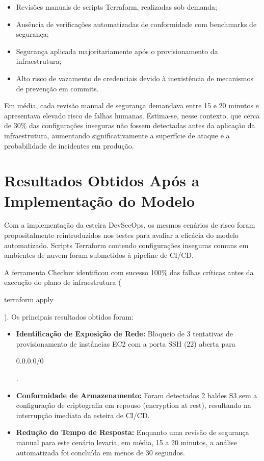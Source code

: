 \begin{itemize}
    \item Revisões manuais de scripts Terraform, realizadas sob demanda;
    \item Ausência de verificações automatizadas de conformidade com benchmarks de segurança;
    \item Segurança aplicada majoritariamente após o provisionamento da infraestrutura;
    \item Alto risco de vazamento de credenciais devido à inexistência de mecanismos de prevenção em commits.
\end{itemize}

Em média, cada revisão manual de segurança demandava entre 15 e 20 minutos e apresentava elevado risco de falhas humanas. Estima-se, nesse contexto, que cerca de 30\% das configurações inseguras não fossem detectadas antes da aplicação da infraestrutura, aumentando significativamente a superfície de ataque e a probabilidade de incidentes em produção.

\section{Resultados Obtidos Após a Implementação do Modelo}
Com a implementação da esteira DevSecOps, os mesmos cenários de risco foram propositalmente reintroduzidos nos testes para avaliar a eficácia do modelo automatizado. Scripts Terraform contendo configurações inseguras comuns em ambientes de nuvem foram submetidos à pipeline de CI/CD.

A ferramenta Checkov identificou com sucesso 100\% das falhas críticas antes da execução do plano de infraestrutura (\begin{foo}terraform apply\end{foo}
). Os principais resultados obtidos foram:

\begin{itemize}
    \item \textbf{Identificação de Exposição de Rede:} Bloqueio de 3 tentativas de provisionamento de instâncias EC2 com a porta SSH (22) aberta para \begin{foo}0.0.0.0/0\end{foo}
    .
    \item \textbf{Conformidade de Armazenamento:} Foram detectados 2 baldes S3 sem a configuração de criptografia em repouso (encryption at rest), resultando na interrupção imediata da esteira de CI/CD.
    \item \textbf{Redução do Tempo de Resposta:} Enquanto uma revisão de segurança manual para este cenário levaria, em média, 15 a 20 minutos, a análise automatizada foi concluída em menos de 30 segundos.
\end{itemize}

